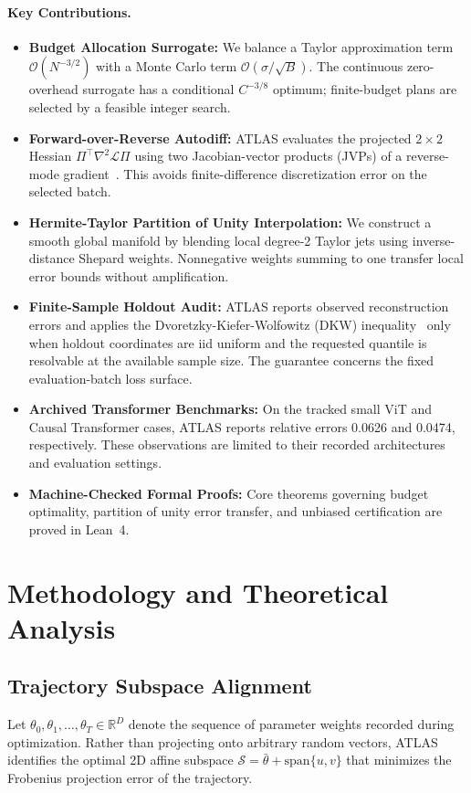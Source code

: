 \documentclass[11pt,a4paper]{article}
\theoremstyle{definition}
\theoremstyle{remark}
\begin{document}
\paragraph{Key Contributions.}
\begin{itemize}
    \item \textbf{Budget Allocation Surrogate:} We balance a Taylor approximation term $\mathcal{O}(N^{-3/2})$ with a Monte Carlo term $\mathcal{O}(\sigma / \sqrt{B})$. The continuous zero-overhead surrogate has a conditional $C^{-3/8}$ optimum; finite-budget plans are selected by a feasible integer search.
    \item \textbf{Forward-over-Reverse Autodiff:} ATLAS evaluates the projected $2 \times 2$ Hessian $\Pi^\top \nabla^2 \mathcal{L} \Pi$ using two Jacobian-vector products (JVPs) of a reverse-mode gradient~\cite{bradbury2018jax}. This avoids finite-difference discretization error on the selected batch.
    \item \textbf{Hermite-Taylor Partition of Unity Interpolation:} We construct a smooth global manifold by blending local degree-2 Taylor jets using inverse-distance Shepard weights. Nonnegative weights summing to one transfer local error bounds without amplification.
    \item \textbf{Finite-Sample Holdout Audit:} ATLAS reports observed reconstruction errors and applies the Dvoretzky-Kiefer-Wolfowitz (DKW) inequality~\cite{massart1990tight} only when holdout coordinates are iid uniform and the requested quantile is resolvable at the available sample size. The guarantee concerns the fixed evaluation-batch loss surface.
    \item \textbf{Archived Transformer Benchmarks:} On the tracked small ViT and Causal Transformer cases, ATLAS reports relative errors 0.0626 and 0.0474, respectively. These observations are limited to their recorded architectures and evaluation settings.
    \item \textbf{Machine-Checked Formal Proofs:} Core theorems governing budget optimality, partition of unity error transfer, and unbiased certification are proved in Lean~4.
\end{itemize}

\section{Methodology and Theoretical Analysis}

\subsection{Trajectory Subspace Alignment}
Let $\theta_0, \theta_1, \dots, \theta_T \in \mathbb{R}^D$ denote the sequence of parameter weights recorded during optimization. Rather than projecting onto arbitrary random vectors, ATLAS identifies the optimal 2D affine subspace $\mathcal{S} = \bar{\theta} + \mathrm{span}\{u, v\}$ that minimizes the Frobenius projection error of the trajectory.
\end{document}
